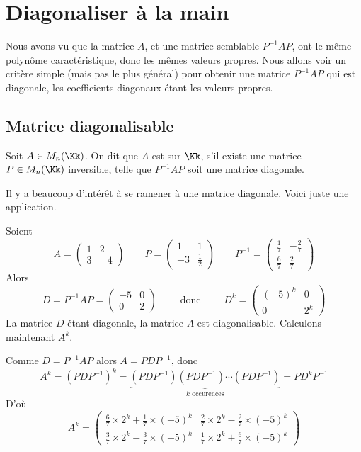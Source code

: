 \documentclass[11pt, class=report,crop=false]{standalone}
\begin{document}
\section{Diagonaliser à la main}

Nous avons vu que la matrice $A$, et une matrice semblable $P^{-1}AP$, ont le même polynôme caractéristique, donc les mêmes valeurs propres. Nous allons voir un critère simple (mais pas le plus général) pour obtenir une matrice $P^{-1}AP$ qui est diagonale, les coefficients diagonaux étant les valeurs propres.

\subsection{Matrice diagonalisable}


\begin{definition}
Soit $A \in M_n(\Kk)$. On dit que $A$ est  
sur $\Kk$, s'il existe une matrice $P \in M_n(\Kk)$ inversible, telle que 
$P^{-1}AP$ soit une matrice diagonale.
\end{definition} 


Il y a beaucoup d'intérêt à se ramener à une matrice diagonale. Voici juste une application.

\begin{exemple}
Soient 
$$A = \begin{pmatrix}
1 & 2 \\
3 & -4
\end{pmatrix}\qquad
P = \begin{pmatrix}
1 & 1 \\
-3 & \frac{1}{2}
\end{pmatrix}\qquad
P^{-1}=\begin{pmatrix}
\frac{1}{7} & -\frac{2}{7} \\
\frac{6}{7} & \frac{2}{7}
\end{pmatrix}$$
Alors 
$$D = P^{-1}AP =
\begin{pmatrix}
-5 & 0 \\
0 & 2
\end{pmatrix}
\qquad \text{ donc } \qquad
D^k=\begin{pmatrix}
(-5)^k & 0 \\
0 & 2^k
\end{pmatrix}
$$
La matrice $D$ étant diagonale, la matrice $A$ est diagonalisable.
Calculons maintenant $A^k$.

Comme $D = P^{-1}AP$ alors $A = PDP^{-1}$, donc
$$A^k = (PDP^{-1})^k = \underbrace{(PDP^{-1})(PDP^{-1}) \cdots (PDP^{-1})}_{k \text{ occurences}} = P D^k P^{-1}$$
D'où
$$A^k=
\begin{pmatrix}
\frac{6}{7} \times 2^{k} + \frac{1}{7} \times \left(-5\right)^{k} &
\frac{2}{7} \times 2^{k} - \frac{2}{7} \times \left(-5\right)^{k} \\
\frac{3}{7} \times 2^{k} - \frac{3}{7} \times \left(-5\right)^{k} &
\frac{1}{7} \times 2^{k} + \frac{6}{7} \times \left(-5\right)^{k}
\end{pmatrix}
$$
\end{exemple}
\end{document}
